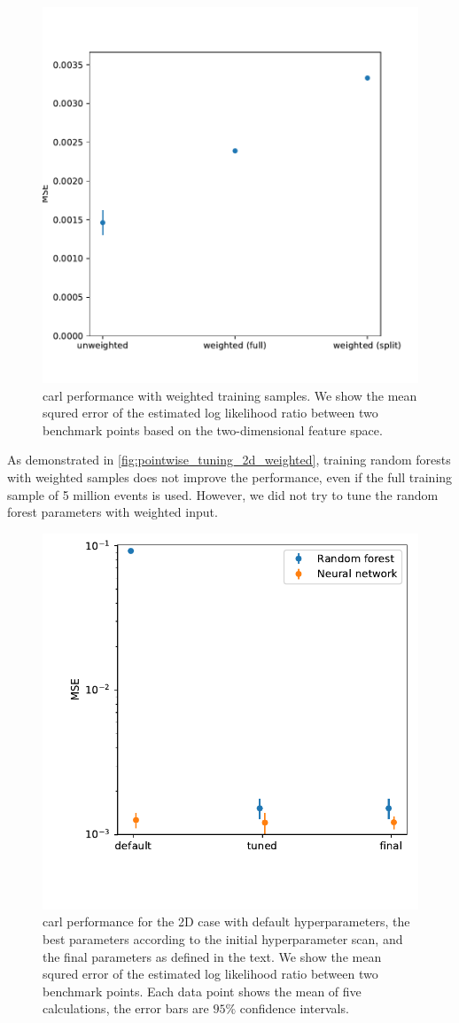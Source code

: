 \begin{figure}
  \includegraphics[height=0.45\textwidth]{figures/pointwise_tuning_2d/mse_weighted_events.pdf}%
  \caption{carl performance with weighted training samples. We show
    the mean squred error of the estimated log likelihood ratio between
    two benchmark points based on the two-dimensional feature
    space.}
  \label{fig:pointwise_tuning_2d_weighted}
\end{figure}

As demonstrated in \autoref{fig:pointwise_tuning_2d_weighted},
training random forests with weighted samples does not improve the
performance, even if the full training sample of 5 million events is
used. However, we did not try to tune the random forest parameters
with weighted input.

\begin{figure}
  \includegraphics[height=0.45\textwidth]{figures/pointwise_tuning_2d/mse_final.pdf}%
  \caption{carl performance for the 2D case with 
    default hyperparameters, the best parameters according to the
    initial hyperparameter scan, and the final parameters as defined
    in the text. We show the mean squred error of the estimated log
    likelihood ratio between two benchmark points. Each data point
    shows the mean of five calculations, the error bars are $95\%$
    confidence intervals.}
  \label{fig:pointwise_tuning_2d_final}
\end{figure}

